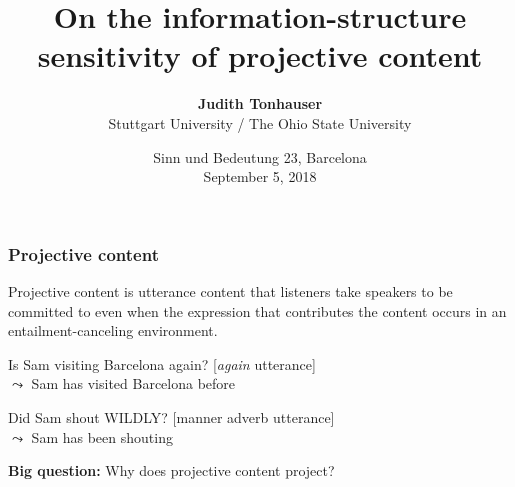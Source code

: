 \documentclass[pdf,xcolor=table,envcountsect,handout]{beamer}
\title{On the information-structure sensitivity of projective content}
\author[Judith Tonhauser]{{\bf Judith Tonhauser} \\ Stuttgart University / The Ohio State University}
\date{\vspace*{1cm} Sinn und Bedeutung 23, Barcelona \\ September 5, 2018 
}
\begin{document}
\begin{frame}[plain]

\maketitle

\end{frame}

\begin{frame}
\frametitle{Projective content}

Projective content is utterance content that listeners take speakers to be committed to even when the expression that contributes the content occurs in an entailment-canceling environment. 



\pause

\begin{exe}

 Is Sam visiting Barcelona again? \hfill [{\em again} utterance]
\\ $\leadsto$ Sam has visited Barcelona before 

\pause
\bigskip

 Did Sam shout WILDLY? \hfill [manner adverb utterance]
\\ $\leadsto$ Sam has been shouting

\end{exe}

\pause
\bigskip

{\bf Big question:} Why does projective content project?

\end{frame}
\end{document}
